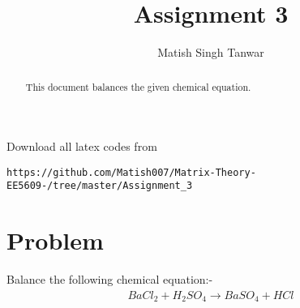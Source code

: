 \documentclass[journal,12pt,twocolumn]{IEEEtran}
\begin{document}
      \def\midbox#1{\raisebox{-0.5\baselineskip}[0in][0in]{#1}}
 \vspace{3cm}
 \title{Assignment 3}
 \author{Matish Singh Tanwar}
 \maketitle
 \newpage
 \bigskip
 \renewcommand{\thetable}{\theenumi}
\vspace{1.0cm}
\begin{abstract}
This document balances the given chemical equation.
\end{abstract}
\vspace{0.5cm}
Download all latex codes from 
\begin{lstlisting}
https://github.com/Matish007/Matrix-Theory-EE5609-/tree/master/Assignment_3
\end{lstlisting}
%
\vspace{0.5mm}
\section{Problem}
Balance the following chemical equation:-
\begin{align}\label{1}
    BaCl_2 + H_2SO_4 \xrightarrow{} BaSO_4 + HCl
\end{align}
\end{document}
